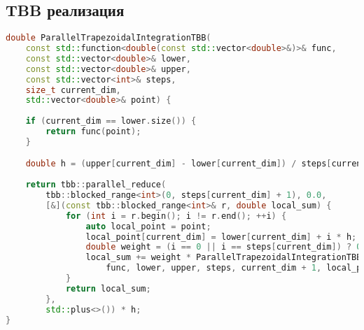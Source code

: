 \documentclass[14pt,a4paper]{extarticle}
\begin{document}
\subsection{TBB реализация}
\begin{lstlisting}[language=C++]
double ParallelTrapezoidalIntegrationTBB(
    const std::function<double(const std::vector<double>&)>& func,
    const std::vector<double>& lower, 
    const std::vector<double>& upper,
    const std::vector<int>& steps, 
    size_t current_dim, 
    std::vector<double>& point) {
    
    if (current_dim == lower.size()) {
        return func(point);
    }

    double h = (upper[current_dim] - lower[current_dim]) / steps[current_dim];
    
    return tbb::parallel_reduce(
        tbb::blocked_range<int>(0, steps[current_dim] + 1), 0.0,
        [&](const tbb::blocked_range<int>& r, double local_sum) {
            for (int i = r.begin(); i != r.end(); ++i) {
                auto local_point = point;
                local_point[current_dim] = lower[current_dim] + i * h;
                double weight = (i == 0 || i == steps[current_dim]) ? 0.5 : 1.0;
                local_sum += weight * ParallelTrapezoidalIntegrationTBB(
                    func, lower, upper, steps, current_dim + 1, local_point);
            }
            return local_sum;
        },
        std::plus<>()) * h;
}
\end{lstlisting}
\end{document}

